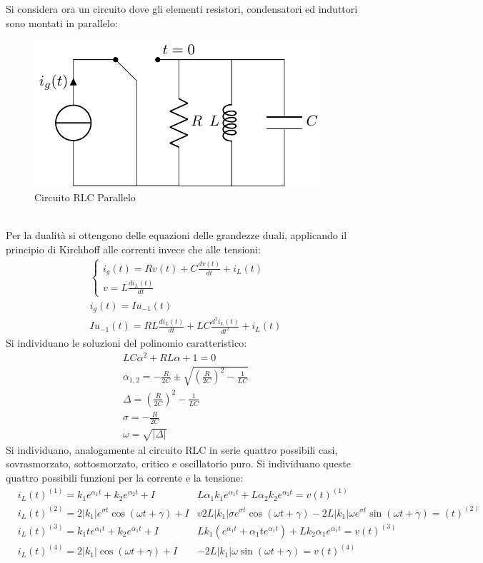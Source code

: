 \documentclass{article}
\numberwithin{equation}{subsection}
\begin{document}
Si considera ora un circuito dove gli elementi resistori, condensatori ed induttori sono montati in parallelo: 
\begin{figure}[ht]%
    \centering
    \includegraphics{circuito-rlc-parallelo.pdf}
    \caption{Circuito RLC Parallelo}
    \label{fig:circuito-rlc-parallelo}
\end{figure}
\\
Per la dualità si ottengono delle equazioni delle grandezze duali, applicando il principio di Kirchhoff alle correnti invece che alle tensioni:
\begin{gather*}
    \begin{cases}
        i_g(t)=Rv(t)+C\displaystyle\frac{dv(t)}{dt}+i_L(t)\\
        v=\displaystyle L\frac{di_L(t)}{dt}
    \end{cases}\\
    i_g(t)=Iu_{-1}(t)\\
    Iu_{-1}(t)=RL\displaystyle\frac{di_L(t)}{dt}+LC\frac{d^2i_L(t)}{dt^2}+i_L(t)
\end{gather*}
Si individuano le soluzioni del polinomio caratteristico:
\begin{gather*}
    LC\alpha^2+RL\alpha+1=0\\
    \alpha_{1,2}=-\displaystyle\frac{R}{2C}\pm\sqrt{\left(\frac{R}{2C}\right)^2-\frac{1}{LC}}\\
    \Delta=\displaystyle\left(\frac{R}{2C}\right)^2-\frac{1}{LC}\\
    \sigma=\displaystyle-\frac{R}{2C}\\
    \omega=\sqrt{|\Delta|}
\end{gather*}
Si individuano, analogamente al circuito RLC in serie quattro possibili casi, sovrasmorzato, sottosmorzato, critico e oscillatorio puro. Si individuano queste quattro 
possibili funzioni per la corrente e la tensione: 
\begin{align*}
    &i_L(t)^{(1)}=k_1e^{\alpha_1t}+k_2e^{\alpha_2t}+I    &L\alpha_1k_1e^{\alpha_1t}+L\alpha_2k_2e^{\alpha_2t}=v(t)^{(1)}\\
    &i_L(t)^{(2)}=2|k_1|e^{\sigma t}\cos(\omega t+\gamma)+I    &v2L|k_1|\sigma e^{\sigma t}\cos(\omega t+\gamma)-2L|k_1|\omega e^{\sigma t}\sin(\omega t+\gamma)=(t)^{(2)}\\
    &i_L(t)^{(3)}=k_1te^{\alpha_1t}+k_2e^{\alpha_1t}+I    &Lk_1(e^{\alpha_1t}+\alpha_1te^{\alpha_1t})+Lk_2\alpha_1e^{\alpha_1t}=v(t)^{(3)}\\
    &i_L(t)^{(4)}=2|k_1|\cos(\omega t+\gamma)+I    &-2L|k_1|\omega\sin(\omega t+\gamma)=v(t)^{(4)}
\end{align*}
\end{document}
